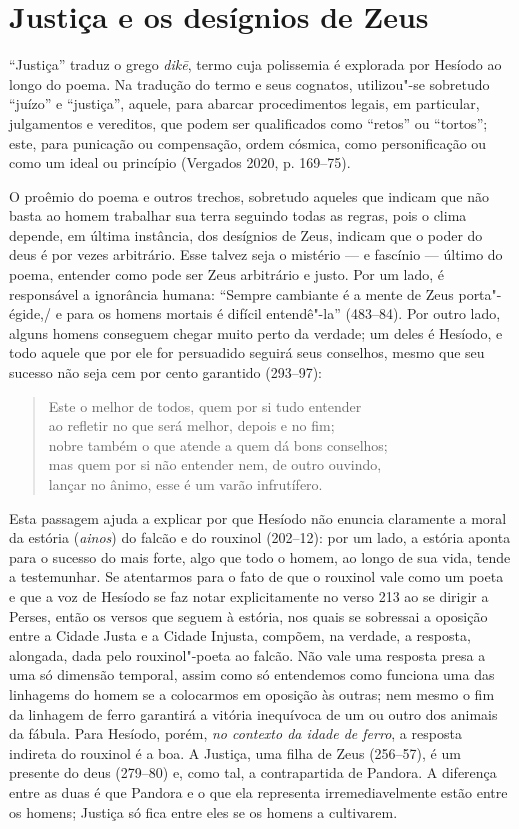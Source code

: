 \section{Justiça e os desígnios de Zeus}

``Justiça'' traduz o grego \emph{dikē}, termo cuja polissemia é
explorada por Hesíodo ao longo do poema. Na tradução do termo e seus
cognatos, utilizou"-se sobretudo ``juízo'' e ``justiça'', aquele, para
abarcar procedimentos legais, em particular, julgamentos e vereditos,
que podem ser qualificados como ``retos'' ou ``tortos''; este, para
punicação ou compensação, ordem cósmica, como personificação ou como um
ideal ou princípio (Vergados 2020, p. 169--75).

O proêmio do poema e outros trechos, sobretudo aqueles que indicam que
não basta ao homem trabalhar sua terra seguindo todas as regras, pois o
clima depende, em última instância, dos desígnios de Zeus, indicam que o
poder do deus é por vezes arbitrário. Esse talvez seja o mistério --- e
fascínio --- último do poema, entender como pode ser Zeus arbitrário e
justo. Por um lado, é responsável a ignorância humana: ``Sempre
cambiante é a mente de Zeus porta"-égide,/ e para os homens mortais é
difícil entendê"-la'' (483--84). Por outro lado, alguns homens conseguem
chegar muito perto da verdade; um deles é Hesíodo, e todo aquele que por
ele for persuadido seguirá seus conselhos, mesmo que seu sucesso não
seja cem por cento garantido (293--97):

\begin{verse}
Este o melhor de todos, quem por si tudo entender\\
ao refletir no que será melhor, depois e no fim;\\
nobre também o que atende a quem dá bons conselhos;\\
mas quem por si não entender nem, de outro ouvindo,\\
lançar no ânimo, esse é um varão infrutífero.
\end{verse}

Esta passagem ajuda a explicar por que Hesíodo não enuncia claramente a
moral da estória (\emph{ainos}) do falcão e do rouxinol (202--12): por um
lado, a estória aponta para o sucesso do mais forte, algo que todo o
homem, ao longo de sua vida, tende a testemunhar. Se atentarmos para o
fato de que o rouxinol vale como um poeta e que a voz de Hesíodo se faz
notar explicitamente no verso 213 ao se dirigir a Perses, então os
versos que seguem à estória, nos quais se sobressai a oposição entre a
Cidade Justa e a Cidade Injusta, compõem, na verdade, a resposta,
alongada, dada pelo rouxinol"-poeta ao falcão. Não vale uma resposta
presa a uma só dimensão temporal, assim como só entendemos como funciona
uma das linhagems do homem se a colocarmos em oposição às outras; nem
mesmo o fim da linhagem de ferro garantirá a vitória inequívoca de um ou
outro dos animais da fábula. Para Hesíodo, porém, \emph{no contexto da
idade de ferro}, a resposta indireta do rouxinol é a boa. A Justiça, uma
filha de Zeus (256--57), é um presente do deus (279--80) e, como tal, a
contrapartida de Pandora. A diferença entre as duas é que Pandora e o
que ela representa irremediavelmente estão entre os homens; Justiça só
fica entre eles se os homens a cultivarem.

